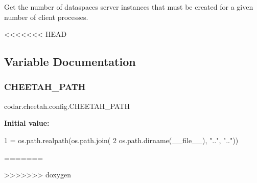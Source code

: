 \begin{DoxyVerb}Get the number of dataspaces server instances that must be created for a
given number of client processes.
\end{DoxyVerb}
<<<<<<< HEAD
 

\subsection{Variable Documentation}
\mbox{\label{namespacecodar_1_1cheetah_1_1config_ab966b03187d09c54028d73f6bf908598}} 
\subsubsection{\texorpdfstring{C\+H\+E\+E\+T\+A\+H\+\_\+\+P\+A\+TH}{CHEETAH\_PATH}}
{\footnotesize\ttfamily codar.\+cheetah.\+config.\+C\+H\+E\+E\+T\+A\+H\+\_\+\+P\+A\+TH}

{\bfseries Initial value\+:}
\begin{DoxyCode}
1 =  os.path.realpath(os.path.join(
2                      os.path.dirname(\_\_file\_\_), \textcolor{stringliteral}{".."}, \textcolor{stringliteral}{".."}))
\end{DoxyCode}
=======
 
>>>>>>> doxygen
